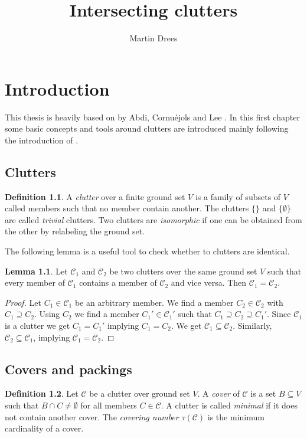 \documentclass[a4paper, 12pt, twoside=false]{scrbook}
\title{Intersecting clutters}
\author{Martin Drees}
\theoremstyle{definition}
\newtheorem*{definition}{Definition}
\newtheorem{lemma}[theorem]{Lemma}
\begin{document}
   \maketitle
   \tableofcontents
   \chapter{Introduction}
   This thesis is heavily based on  by Abdi, Cornuéjols and Lee \cite{restrictions}.
   In this first chapter some basic concepts and tools around clutters are introduced mainly following the introduction of \cite{restrictions}.
   \section{Clutters}
   \begin{definition}
       A \emph{clutter} over a finite ground set $V$ is a family of subsets of $V$ called members such that no member contain another.
       The clutters $\{\}$ and $\{\emptyset\}$ are called \emph{trivial} clutters.
       Two clutters are \emph{isomorphic} if one can be obtained from the other by relabeling the ground set.
   \end{definition}
   The following lemma is a useful tool to check whether to clutters are identical.
   \begin{lemma}\label{equalclutters}
       Let $\mathcal{C}_1$ and $\mathcal{C}_2$ be two clutters over the same ground set $V$ such that every member of $\mathcal{C}_1$ contains a member of $\mathcal{C}_2$ and vice versa.
       Then $\mathcal{C}_1=\mathcal{C}_2$.
   \end{lemma}

   \begin{proof}
       Let $C_1 \in \mathcal{C}_1$ be an arbitrary member.
       We find a member $C_2 \in \mathcal{C}_2$ with $C_1 \supseteq C_2$.
       Using $C_2$ we find a member $C_1' \in \mathcal{C}_1'$ such that $C_1 \supseteq C_2 \supseteq C_1'$.
       Since $\mathcal{C}_1$ is a clutter we get $C_1=C_1'$ implying $C_1=C_2$.
       We get $\mathcal{C}_1 \subseteq \mathcal{C}_2$.
       Similarly, $\mathcal{C}_2 \subseteq \mathcal{C}_1$, implying $\mathcal{C}_1=\mathcal{C}_2$.
   \end{proof}

\section{Covers and packings}
\begin{definition}
    Let $\mathcal{C}$ be a clutter over ground set $V$.
    A \emph{cover} of $\mathcal{C}$ is a set $B \subseteq V$ such that $B \cap C \neq \emptyset$ for all members $C \in \mathcal{C}$.
    A clutter is called \emph{minimal} if it does not contain another cover.
    The \emph{covering number} $\tau(\mathcal{C})$ is the minimum cardinality of a cover.
\end{definition}
\end{document}
